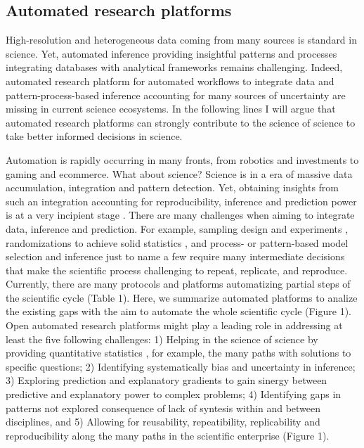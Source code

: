 \documentclass[authoryear,1p,12pt]{elsarticle}
\begin{document}
\subsection{{\bf Automated research platforms}}
   High-resolution and heterogeneous data coming from many sources is
   standard in science. Yet, automated inference providing insightful
   patterns and processes integrating databases with analytical
   frameworks remains challenging. Indeed, automated research platform
   for automated workflows to integrate data and pattern-process-based
   inference accounting for many sources of uncertainty are missing in
   current science ecosystems. In the following lines I will argue
   that automated research platforms can strongly contribute to the
   science of science to take better informed decisions in science.

   Automation is rapidly occurring in many fronts, from robotics and
   investments to gaming and ecommerce. What about science? Science is
   in a era of massive data accumulation, integration and pattern
   detection. Yet, obtaining insights from such an integration
   accounting for reproducibility, inference and prediction power is
   at a very incipient stage
   \citep{Ioannidis2005,Reichsteietal2019}. There are many challenges
   when aiming to integrate data, inference and prediction. For
   example, sampling design and experiments 
   \citep{Voelkl2018}, randomizations to achieve solid statistics
   , and process- or pattern-based model
   selection and inference  just to name a few
   require many intermediate decisions that make the scientific
   process challenging to repeat, replicate, and reproduce. Currently,
   there are many protocols and platforms automatizing partial steps
   of the scientific cycle (Table 1). Here, we summarize automated
   platforms to analize the existing gaps with the aim to automate the
   whole scientific cycle (Figure 1). Open automated research
   platforms  might play a
   leading role in addressing at least the five following challenges:
   1) Helping in the science of science by providing quantitative
   statistics \citep{Fortunatoeaao0185}, for example, the many paths
   with solutions to specific questions; 2) Identifying systematically
   bias and uncertainty in inference; 3) Exploring prediction and
   explanatory gradients to gain sinergy between predictive and
   explanatory power to complex problems; 4) Identifying gaps in
   patterns not explored consequence of lack of syntesis within and
   between disciplines, and 5) Allowing for reusability,
   repeatibility, replicability and reproducibility along the many
   paths in the scientific enterprise (Figure 1).
\end{document}
